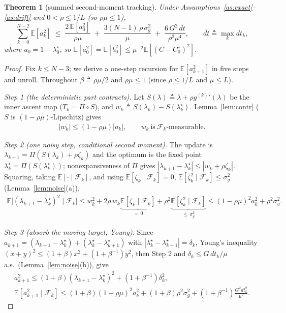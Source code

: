 \documentclass[11pt]{article}
\newcommand{\E}{\mathbb{E}}
\newcommand{\F}{\mathcal{F}}
\newcommand{\proj}{\Pi}
\theoremstyle{plain}
\newtheorem{theorem}{Theorem}
\theoremstyle{definition}
\theoremstyle{remark}
\begin{document}
\begin{theorem}[summed second-moment tracking]
\label{thm:track}
Under Assumptions~\ref{as:exact}--\ref{as:drift} and $0<\rho\le1/L$ (so $\rho\mu\le1$),
\begin{equation}
\label{eq:track}
\sum_{k=0}^{N-2}\E[a_k^2]\;\le\;\frac{2\,\E[a_0^2]}{\rho\mu}
\;+\;\frac{3(N-1)\,\rho\,\sigma_g^2}{\mu}
\;+\;\frac{6\,G^2\,\overline{dt}}{\rho^2\mu^4},
\qquad \overline{dt}\triangleq\max_k dt_k,
\end{equation}
where $a_0=1-\lambda^\star_0$, so $\E[a_0^2]=\E[b_0^2]\le\mu^{-2}\E[(C-C^\star_0)^2]$.
\end{theorem}
\begin{proof}
Fix $k\le N-3$; we derive a one-step recursion for $\E[a_{k+1}^2]$ in five steps and unroll.
Throughout $\beta\triangleq\rho\mu/2$ and $\rho\mu\le1$ (since $\rho\le1/L$ and $\mu\le L$).

\emph{Step 1 (the deterministic part contracts).} Let $S(\lambda)\triangleq\lambda+\rho g^{(k)}{}'(\lambda)$
be the inner ascent map ($T_k=\proj\circ S$), and $w_k\triangleq S(\lambda_k)-S(\lambda^\star_k)$.
Lemma~\ref{lem:contr} ($S$ is $(1-\rho\mu)$-Lipschitz) gives
\begin{gather*}
|w_k|\le(1-\rho\mu)|a_k|,\qquad w_k\ \text{is}\ \F_k\text{-measurable}.
\end{gather*}

\emph{Step 2 (one noisy step, conditional second moment).} The update is
$\lambda_{k+1}=\proj(S(\lambda_k)+\rho\zeta_k)$ and the optimum is the fixed point
$\lambda^\star_k=\proj(S(\lambda^\star_k))$; nonexpansiveness of $\proj$ gives
$|\lambda_{k+1}-\lambda^\star_k|\le|w_k+\rho\zeta_k|$. Squaring, taking $\E[\cdot\mid\F_k]$,
and using $\E[\zeta_k\mid\F_k]=0$, $\E[\zeta_k^2\mid\F_k]\le\sigma_g^2$ (Lemma~\ref{lem:noise}(a)),
\begin{gather*}
\E\big[(\lambda_{k+1}-\lambda^\star_k)^2\mid\F_k\big]
\le w_k^2+2\rho\,w_k\underbrace{\E[\zeta_k\mid\F_k]}_{=\,0}+\rho^2\underbrace{\E[\zeta_k^2\mid\F_k]}_{\le\,\sigma_g^2}
\le(1-\rho\mu)^2a_k^2+\rho^2\sigma_g^2.
\end{gather*}

\emph{Step 3 (absorb the moving target, Young).} Since
$a_{k+1}=(\lambda_{k+1}-\lambda^\star_k)+(\lambda^\star_k-\lambda^\star_{k+1})$ with
$|\lambda^\star_k-\lambda^\star_{k+1}|=\delta_k$, Young's inequality
$(x+y)^2\le(1+\beta)x^2+(1+\beta^{-1})y^2$, then Step 2 and $\delta_k\le G\,dt_k/\mu$ a.s.\ (Lemma~\ref{lem:noise}(b)), give
\begin{gather*}
a_{k+1}^2\le(1+\beta)(\lambda_{k+1}-\lambda^\star_k)^2+(1+\beta^{-1})\delta_k^2,\\
\E[a_{k+1}^2\mid\F_k]\le(1+\beta)(1-\rho\mu)^2a_k^2+(1+\beta)\rho^2\sigma_g^2+(1+\beta^{-1})\frac{G^2dt_k^2}{\mu^2}.
\end{gather*}


\end{proof}
\end{document}
